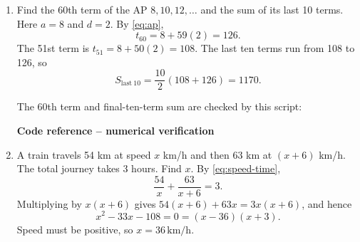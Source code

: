 \begin{enumerate}[label={},leftmargin=0pt,itemsep=9pt]
\setcounter{qcurrent}{22}\setcounter{equation}{0}
\item[\textbf{1.2.22}] Find the 60th term of the AP $8,10,12,\ldots$ and the sum of its last 10 terms.
\solution Here $a=8$ and $d=2$. By \eqref{eq:ap},
\begin{equation}
t_{60}=8+59(2)=126.
\end{equation}
The 51st term is $t_{51}=8+50(2)=108$. The last ten terms run from 108 to 126, so
\begin{equation}
S_{\mathrm{last\ 10}}=\frac{10}{2}(108+126)=1170.
\end{equation}



The 60th term and final-ten-term sum are checked by this script:
\par\smallskip
\noindent\textbf{Code reference -- numerical verification}
\par\noindent{}
\par\smallskip
\setcounter{qcurrent}{23}\setcounter{equation}{0}
\item[\textbf{1.2.23}] A train travels 54 km at speed $x$ km/h and then 63 km at $(x+6)$ km/h. The total journey takes 3 hours. Find $x$.
\solution By \eqref{eq:speed-time},
\begin{equation}
\frac{54}{x}+\frac{63}{x+6}=3.
\end{equation}
Multiplying by $x(x+6)$ gives $54(x+6)+63x=3x(x+6)$, and hence
\begin{equation}
x^2-33x-108=0=(x-36)(x+3).
\end{equation}
Speed must be positive, so $x=36\,\mathrm{km/h}$.





\end{enumerate}
